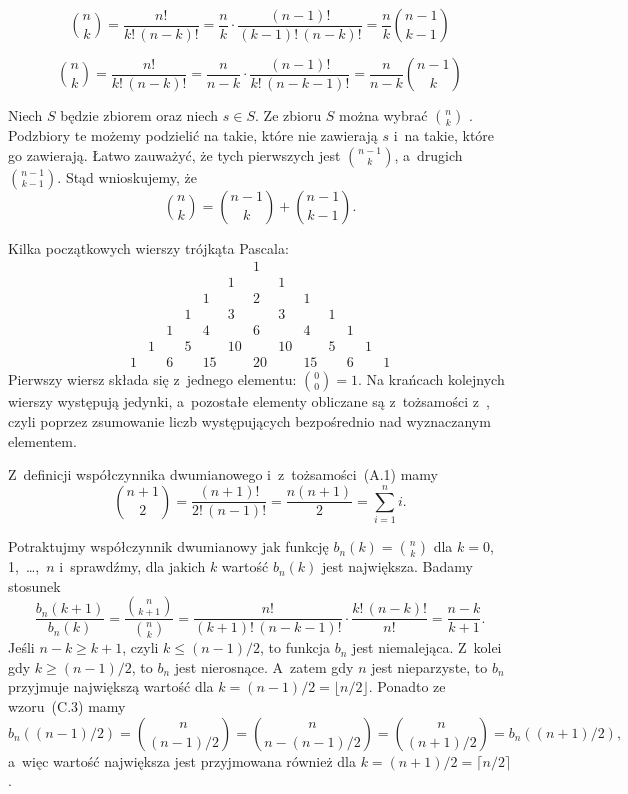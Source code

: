 \exercise %
\[
	\binom{n}{k} = \frac{n!}{k!\,(n-k)!} = \frac{n}{k}\cdot\frac{(n-1)!}{(k-1)!\,(n-k)!} = \frac{n}{k}\binom{n-1}{k-1}
\]

\exercise %
\[
	\binom{n}{k} = \frac{n!}{k!\,(n-k)!} = \frac{n}{n-k}\cdot\frac{(n-1)!}{k!\,(n-k-1)!} = \frac{n}{n-k}\binom{n-1}{k}
\]

\exercise %
Niech $S$ będzie zbiorem  oraz niech $s\in S$. Ze zbioru $S$ można wybrać $\binom{n}{k}$ . Podzbiory te możemy podzielić na takie, które nie zawierają $s$ i~na takie, które go zawierają. Łatwo zauważyć, że tych pierwszych jest $\binom{n-1}{k}$, a~drugich $\binom{n-1}{k-1}$. Stąd wnioskujemy, że
\[
    \binom{n}{k} = \binom{n-1}{k}+\binom{n-1}{k-1}.
\]

\exercise %
Kilka początkowych wierszy trójkąta Pascala:
\[
	\begin{array}{ccccccccccccc}
		&&&&&& 1 \\
		&&&&& 1 && 1 \\
		&&&& 1 && 2 && 1 \\
		&&& 1 && 3 && 3 && 1 \\
		&& 1 && 4 && 6 && 4 && 1 \\
		& 1 && 5 && 10 && 10 && 5 && 1 \\
		1 && 6 && 15 && 20 && 15 && 6 && 1
	\end{array}
\]
Pierwszy wiersz składa się z~jednego elementu: $\binom{0}{0}=1$. Na krańcach kolejnych wierszy występują jedynki, a~pozostałe elementy obliczane są z~tożsamości z~, czyli poprzez zsumowanie liczb występujących bezpośrednio nad wyznaczanym elementem.

\exercise %
Z~definicji współczynnika dwumianowego i~z~tożsamości~(A.1) mamy
\[
	\binom{n+1}{2} = \frac{(n+1)!}{2!\,(n-1)!} = \frac{n(n+1)}{2} = \sum_{i=1}^ni.
\]

\exercise %
Potraktujmy współczynnik dwumianowy jak funkcję $b_n(k)=\binom{n}{k}$ dla $k=0$, 1,~\dots,~$n$ i~sprawdźmy, dla jakich $k$ wartość $b_n(k)$ jest największa. Badamy stosunek
\[
	\frac{b_n(k+1)}{b_n(k)} = \frac{\binom{n}{k+1}}{\binom{n}{k}} = \frac{n!}{(k+1)!\,(n-k-1)!}\cdot\frac{k!\,(n-k)!}{n!} = \frac{n-k}{k+1}.
\]
Jeśli $n-k\ge k+1$, czyli $k\le(n-1)/2$, to funkcja $b_n$ jest niemalejąca. Z~kolei gdy $k\ge(n-1)/2$, to $b_n$ jest nierosnące. A~zatem gdy $n$ jest nieparzyste, to $b_n$ przyjmuje największą wartość dla $k=(n-1)/2=\lfloor n/2\rfloor$. Ponadto ze wzoru~(C.3) mamy
\[
    b_n((n-1)/2) = \binom{n}{(n-1)/2} = \binom{n}{n-(n-1)/2} = \binom{n}{(n+1)/2} = b_n((n+1)/2),
\]
a~więc wartość największa jest przyjmowana również dla $k=(n+1)/2=\lceil n/2\rceil$.


